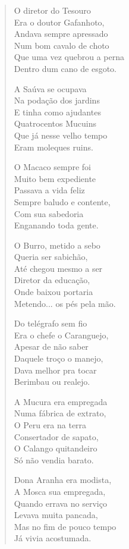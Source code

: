 \begin{verse}
O diretor do Tesouro\\
Era o doutor Gafanhoto,\\
Andava sempre apressado\\
Num bom cavalo de choto\\
Que uma vez quebrou a perna\\
Dentro dum cano de esgoto.

A Saúva se ocupava\\
Na podação dos jardins\\
E tinha como ajudantes\\
Quatrocentos Mucuins\\
Que já nesse velho tempo\\
Eram moleques ruins.
\pagebreak

O Macaco sempre foi\\
Muito bem expediente\\
Passava a vida feliz\\
Sempre baludo e contente,\\
Com sua sabedoria\\
Enganando toda gente.

O Burro, metido a sebo\\
Queria ser sabichão,\\
Até chegou mesmo a ser\\
Diretor da educação,\\
Onde baixou portaria\\
Metendo... os pés pela mão.

Do telégrafo sem fio\\
Era o chefe o Caranguejo,\\
Apesar de não saber\\
Daquele troço o manejo,\\
Dava melhor pra tocar\\
Berimbau ou realejo.

A Mucura era empregada\\
Numa fábrica de extrato,\\
O Peru era na terra\\
Consertador de sapato,\\
O Calango quitandeiro\\
Só não vendia barato.
\pagebreak

Dona Aranha era modista,\\
A Mosca sua empregada,\\
Quando errava no serviço\\
Levava muita pancada,\\
Mas no fim de pouco tempo\\
Já vivia acostumada.


\end{verse}
